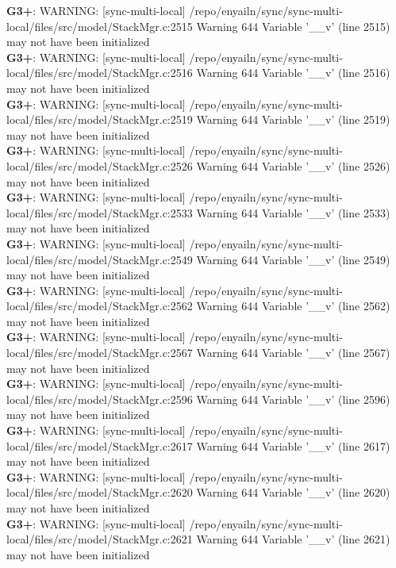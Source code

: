 \documentclass[12pt,twoside]{article}
\begin{document}
\textbf{G3+}: WARNING: [sync-multi-local] /repo/enyailn/sync/sync-multi-local/files/src/model/StackMgr.c:2515 Warning 644 Variable '\_\_v' (line 2515) may not have been initialized\\ 
\textbf{G3+}: WARNING: [sync-multi-local] /repo/enyailn/sync/sync-multi-local/files/src/model/StackMgr.c:2516 Warning 644 Variable '\_\_v' (line 2516) may not have been initialized\\ 
\textbf{G3+}: WARNING: [sync-multi-local] /repo/enyailn/sync/sync-multi-local/files/src/model/StackMgr.c:2519 Warning 644 Variable '\_\_v' (line 2519) may not have been initialized\\ 
\textbf{G3+}: WARNING: [sync-multi-local] /repo/enyailn/sync/sync-multi-local/files/src/model/StackMgr.c:2526 Warning 644 Variable '\_\_v' (line 2526) may not have been initialized\\ 
\textbf{G3+}: WARNING: [sync-multi-local] /repo/enyailn/sync/sync-multi-local/files/src/model/StackMgr.c:2533 Warning 644 Variable '\_\_v' (line 2533) may not have been initialized\\ 
\textbf{G3+}: WARNING: [sync-multi-local] /repo/enyailn/sync/sync-multi-local/files/src/model/StackMgr.c:2549 Warning 644 Variable '\_\_v' (line 2549) may not have been initialized\\ 
\textbf{G3+}: WARNING: [sync-multi-local] /repo/enyailn/sync/sync-multi-local/files/src/model/StackMgr.c:2562 Warning 644 Variable '\_\_v' (line 2562) may not have been initialized\\ 
\textbf{G3+}: WARNING: [sync-multi-local] /repo/enyailn/sync/sync-multi-local/files/src/model/StackMgr.c:2567 Warning 644 Variable '\_\_v' (line 2567) may not have been initialized\\ 
\textbf{G3+}: WARNING: [sync-multi-local] /repo/enyailn/sync/sync-multi-local/files/src/model/StackMgr.c:2596 Warning 644 Variable '\_\_v' (line 2596) may not have been initialized\\ 
\textbf{G3+}: WARNING: [sync-multi-local] /repo/enyailn/sync/sync-multi-local/files/src/model/StackMgr.c:2617 Warning 644 Variable '\_\_v' (line 2617) may not have been initialized\\ 
\textbf{G3+}: WARNING: [sync-multi-local] /repo/enyailn/sync/sync-multi-local/files/src/model/StackMgr.c:2620 Warning 644 Variable '\_\_v' (line 2620) may not have been initialized\\ 
\textbf{G3+}: WARNING: [sync-multi-local] /repo/enyailn/sync/sync-multi-local/files/src/model/StackMgr.c:2621 Warning 644 Variable '\_\_v' (line 2621) may not have been initialized\\ 
\end{document}
